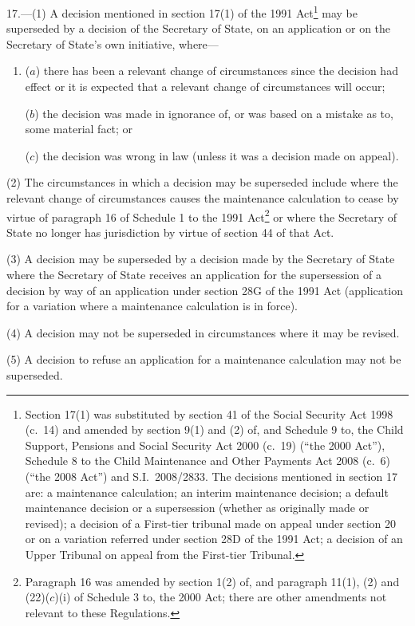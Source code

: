 \documentclass[12pt,a4paper]{article}
\begin{document}
17.---(1)  A decision mentioned in section 17(1) of the 1991 Act\footnote{Section 17(1) was substituted by section 41 of the Social Security Act 1998 (c.~14) and amended by section 9(1) and (2) of, and Schedule 9 to, the Child Support, Pensions and Social Security Act 2000 (c.~19) (“the 2000 Act”), Schedule 8 to the Child Maintenance and Other Payments Act 2008 (c.~6) (“the 2008 Act”) and S.I.~2008/2833. The decisions mentioned in section 17 are: a maintenance calculation; an interim maintenance decision; a default maintenance decision or a supersession (whether as originally made or revised); a decision of a First-tier tribunal made on appeal under section 20 or on a variation referred under section 28D of the 1991 Act; a decision of an Upper Tribunal on appeal from the First-tier Tribunal.} may be superseded by a decision of the Secretary of State, on an application or on the Secretary of State’s own initiative, where—
\begin{enumerate}\item[]
($a$) there has been a relevant change of circumstances since the decision had effect or it is expected that a relevant change of circumstances will occur;

($b$) the decision was made in ignorance of, or was based on a mistake as to, some material fact; or

($c$) the decision was wrong in law (unless it was a decision made on appeal).
\end{enumerate}

(2) The circumstances in which a decision may be superseded include where the relevant change of circumstances causes the maintenance calculation to cease by virtue of paragraph 16 of Schedule 1 to the 1991 Act\footnote{Paragraph 16 was amended by section 1(2) of, and paragraph 11(1), (2) and (22)($c$)(i)  of Schedule 3 to, the 2000 Act; there are other amendments not relevant to these Regulations.} or where the Secretary of State no longer has jurisdiction by virtue of section 44 of that Act.

(3) A decision may be superseded by a decision made by the Secretary of State where the Secretary of State receives an application for the supersession of a decision by way of an application under section 28G of the 1991 Act (application for a variation where a maintenance calculation is in force).

(4) A decision may not be superseded in circumstances where it may be revised.

(5) A decision to refuse an application for a maintenance calculation may not be superseded.
\end{document}
